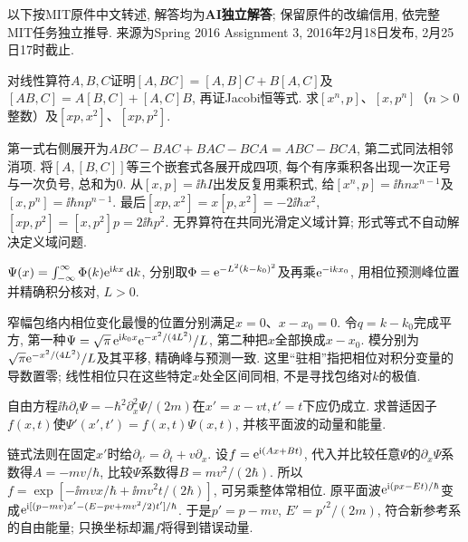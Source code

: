 以下按MIT原件中文转述, 解答均为\textbf{AI独立解答}; 保留原件的改编信用, 依完整MIT任务独立推导. 来源为Spring 2016 Assignment 3, 2016年2月18日发布, 2月25日17时截止.
\begin{exercise}对线性算符$A,B,C$证明$[A,BC]=[A,B]C+B[A,C]$及$[AB,C]=A[B,C]+[A,C]B$, 再证Jacobi恒等式. 求$[x^n,p]$、$[x,p^n]$（$n>0$整数）及$[xp,x^2]$、$[xp,p^2]$.\end{exercise}
\begin{solution}第一式右侧展开为$ABC-BAC+BAC-BCA=ABC-BCA$, 第二式同法相邻消项. 将$[A,[B,C]]$等三个嵌套式各展开成四项, 每个有序乘积各出现一次正号与一次负号, 总和为0. 从$[x,p]=\ii\hbar I$出发反复用乘积式, 给$[x^n,p]=\ii\hbar nx^{n-1}$及$[x,p^n]=\ii\hbar np^{n-1}$. 最后$[xp,x^2]=x[p,x^2]=-2\ii\hbar x^2$, $[xp,p^2]=[x,p^2]p=2\ii\hbar p^2$. 无界算符在共同光滑定义域计算; 形式等式不自动解决定义域问题.\end{solution}
\begin{exercise}$\Psi(x)=\int_{-\infty}^{\infty}\Phi(k)\mathrm e^{\mathrm i kx}\,\mathrm d k$, 分别取$\Phi=\mathrm e^{-L^2(k-k_0)^2}$及再乘$\mathrm e^{-\mathrm i kx_0}$, 用相位预测峰位置并精确积分核对, $L>0$.\end{exercise}
\begin{solution}窄幅包络内相位变化最慢的位置分别满足$x=0$、$x-x_0=0$. 令$q=k-k_0$完成平方, 第一种$\Psi=\sqrt\pi\,\mathrm e^{\mathrm i k_0x}\mathrm e^{-x^2/(4L^2)}/L$, 第二种把$x$全部换成$x-x_0$. 模分别为$\sqrt\pi\mathrm e^{-x^2/(4L^2)}/L$及其平移, 精确峰与预测一致. 这里“驻相”指把相位对积分变量的导数置零; 线性相位只在这些特定$x$处全区间同相, 不是寻找包络对$k$的极值.\end{solution}
\begin{exercise}自由方程$\ii\hbar\partial_t\Psi=-\hbar^2\partial_x^2\Psi/(2m)$在$x'=x-vt,t'=t$下应仍成立. 求普适因子$f(x,t)$使$\Psi'(x',t')=f(x,t)\Psi(x,t)$, 并核平面波的动量和能量.\end{exercise}
\begin{solution}链式法则在固定$x'$时给$\partial_{t'}=\partial_t+v\partial_x$. 设$f=\mathrm e^{\mathrm i(Ax+Bt)}$, 代入并比较任意$\Psi$的$\partial_x\Psi$系数得$A=-mv/\hbar$, 比较$\Psi$系数得$B=mv^2/(2\hbar)$. 所以$f=\exp[-\ii mvx/\hbar+\ii mv^2t/(2\hbar)]$, 可另乘整体常相位. 原平面波$\mathrm e^{\mathrm i(px-Et)/\hbar}$变成$\mathrm e^{\mathrm i[(p-mv)x'-(E-pv+mv^2/2)t']/\hbar}$. 于是$p'=p-mv$, $E'=p'^2/(2m)$, 符合新参考系的自由能量; 只换坐标却漏$f$将得到错误动量.\end{solution}
